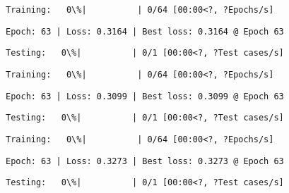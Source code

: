 \documentclass[11pt]{article}
\begin{document}
    
    
    \begin{Verbatim}[commandchars=\\\{\}]
Training:   0\%|          | 0/64 [00:00<?, ?Epochs/s]
    \end{Verbatim}

    
    \begin{Verbatim}[commandchars=\\\{\}]
Epoch: 63 | Loss: 0.3164 | Best loss: 0.3164 @ Epoch 63
    \end{Verbatim}

    
    \begin{Verbatim}[commandchars=\\\{\}]
Testing:   0\%|          | 0/1 [00:00<?, ?Test cases/s]
    \end{Verbatim}

    
    
    \begin{Verbatim}[commandchars=\\\{\}]
Training:   0\%|          | 0/64 [00:00<?, ?Epochs/s]
    \end{Verbatim}

    
    \begin{Verbatim}[commandchars=\\\{\}]
Epoch: 63 | Loss: 0.3099 | Best loss: 0.3099 @ Epoch 63
    \end{Verbatim}

    
    \begin{Verbatim}[commandchars=\\\{\}]
Testing:   0\%|          | 0/1 [00:00<?, ?Test cases/s]
    \end{Verbatim}

    
    
    \begin{Verbatim}[commandchars=\\\{\}]
Training:   0\%|          | 0/64 [00:00<?, ?Epochs/s]
    \end{Verbatim}

    
    \begin{Verbatim}[commandchars=\\\{\}]
Epoch: 63 | Loss: 0.3273 | Best loss: 0.3273 @ Epoch 63
    \end{Verbatim}

    
    \begin{Verbatim}[commandchars=\\\{\}]
Testing:   0\%|          | 0/1 [00:00<?, ?Test cases/s]
    \end{Verbatim}
\end{document}
